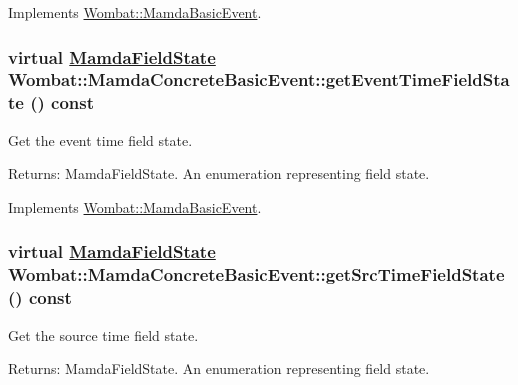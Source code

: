 Implements \hyperlink{classWombat_1_1MamdaBasicEvent_51cc0b9d4c2b8a982ccd18b339707cb5}{Wombat::Mamda\-Basic\-Event}.\hypertarget{classWombat_1_1MamdaConcreteBasicEvent_9c45716bd83bba7832a3651bda399443}{
\subsubsection[getEventTimeFieldState]{\setlength{\rightskip}{0pt plus 5cm}virtual \hyperlink{namespaceWombat_93aac974f2ab713554fd12a1fa3b7d2a}{Mamda\-Field\-State} Wombat::Mamda\-Concrete\-Basic\-Event::get\-Event\-Time\-Field\-State () const}}
\label{classWombat_1_1MamdaConcreteBasicEvent_9c45716bd83bba7832a3651bda399443}


Get the event time field state. 

\begin{Desc}
\item[Returns:]Mamda\-Field\-State. An enumeration representing field state. \end{Desc}


Implements \hyperlink{classWombat_1_1MamdaBasicEvent_ff3932065e16e660fb6cd9285b46f7d0}{Wombat::Mamda\-Basic\-Event}.\hypertarget{classWombat_1_1MamdaConcreteBasicEvent_cf84914b1c21f84fc7488a2b385816a6}{
\subsubsection[getSrcTimeFieldState]{\setlength{\rightskip}{0pt plus 5cm}virtual \hyperlink{namespaceWombat_93aac974f2ab713554fd12a1fa3b7d2a}{Mamda\-Field\-State} Wombat::Mamda\-Concrete\-Basic\-Event::get\-Src\-Time\-Field\-State () const}}
\label{classWombat_1_1MamdaConcreteBasicEvent_cf84914b1c21f84fc7488a2b385816a6}


Get the source time field state. 

\begin{Desc}
\item[Returns:]Mamda\-Field\-State. An enumeration representing field state. \end{Desc}


